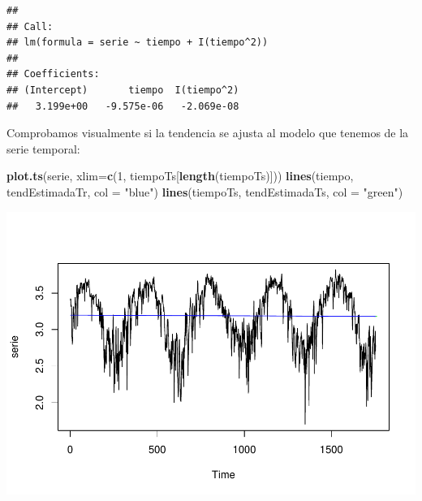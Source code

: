 \documentclass[]{article}
\newenvironment{Shaded}{\begin{snugshade}}{\end{snugshade}}
\newcommand{\KeywordTok}[1]{\textcolor[rgb]{0.13,0.29,0.53}{\textbf{#1}}}
\newcommand{\DataTypeTok}[1]{\textcolor[rgb]{0.13,0.29,0.53}{#1}}
\newcommand{\DecValTok}[1]{\textcolor[rgb]{0.00,0.00,0.81}{#1}}
\newcommand{\StringTok}[1]{\textcolor[rgb]{0.31,0.60,0.02}{#1}}
\newcommand{\CommentTok}[1]{\textcolor[rgb]{0.56,0.35,0.01}{\textit{#1}}}
\newcommand{\OperatorTok}[1]{\textcolor[rgb]{0.81,0.36,0.00}{\textbf{#1}}}
\newcommand{\NormalTok}[1]{#1}
\begin{document}
\begin{verbatim}
## 
## Call:
## lm(formula = serie ~ tiempo + I(tiempo^2))
## 
## Coefficients:
## (Intercept)       tiempo  I(tiempo^2)  
##   3.199e+00   -9.575e-06   -2.069e-08
\end{verbatim}

\begin{Shaded}
\end{Shaded}

Comprobamos visualmente si la tendencia se ajusta al modelo que tenemos
de la serie temporal:

\begin{Shaded}
\begin{Highlighting}[]
\KeywordTok{plot.ts}\NormalTok{(serie, }\DataTypeTok{xlim=}\KeywordTok{c}\NormalTok{(}\DecValTok{1}\NormalTok{, tiempoTs[}\KeywordTok{length}\NormalTok{(tiempoTs)])) }
\KeywordTok{lines}\NormalTok{(tiempo, tendEstimadaTr, }\DataTypeTok{col =} \StringTok{"blue"}\NormalTok{) }
\KeywordTok{lines}\NormalTok{(tiempoTs, tendEstimadaTs, }\DataTypeTok{col =} \StringTok{"green"}\NormalTok{)}
\end{Highlighting}
\end{Shaded}

\includegraphics{exercise2_files/figure-latex/unnamed-chunk-16-1.pdf}
\end{document}
